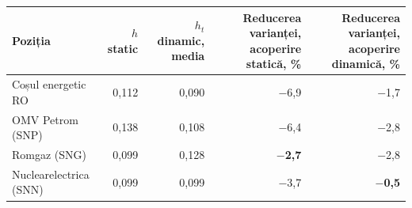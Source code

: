 \begin{tabular}{lrrrr}
\toprule
Poziția & $h$ static & $h_t$ dinamic, media & Reducerea varianței, acoperire statică, \% & Reducerea varianței, acoperire dinamică, \% \\
\midrule
Coșul energetic RO & 0,112 & 0,090 & $-$6,9 & $-$1,7 \\
OMV Petrom (SNP) & 0,138 & 0,108 & $-$6,4 & $-$2,8 \\
Romgaz (SNG) & 0,099 & 0,128 & \textbf{$-$2,7} & $-$2,8 \\
Nuclearelectrica (SNN) & 0,099 & 0,099 & $-$3,7 & \textbf{$-$0,5} \\
\bottomrule
\end{tabular}
